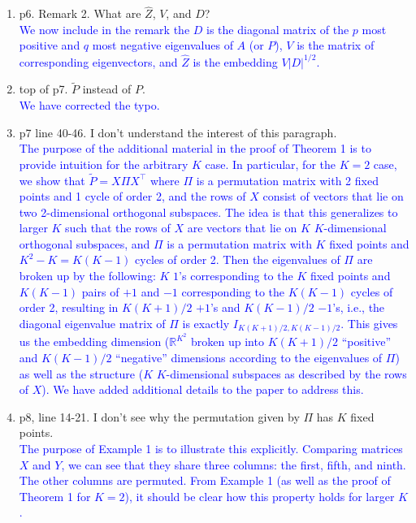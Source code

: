 \documentclass[
]{article}
\begin{document}
\begin{enumerate}
{  }
\item
  p6. Remark 2. What are \(\hat{Z}\), \(V\), and \(D\)?\\
  \textcolor{blue}{
  We now include in the remark the $D$ is the diagonal matrix of the $p$ most positive and $q$ most negative eigenvalues of $A$ (or $P$), $V$ is the matrix of corresponding eigenvectors, and $\hat{Z}$ is the embedding $V |D|^{1/2}$.
  }
\item
  top of p7. \(\tilde{P}\) instead of \({P}\).\\
  \textcolor{blue}{
  We have corrected the typo. 
  }
\item
  p7 line 40-46. I don't understand the interest of this paragraph.\\
  \textcolor{blue}{
  The purpose of the additional material in the proof of Theorem 1 is to provide intuition for the arbitrary $K$ case. 
  In particular, for the $K = 2$ case, we show that $\tilde{P} = X \Pi X^\top$ where $\Pi$ is a permutation matrix with 2 fixed points and 1 cycle of order 2, and the rows of $X$ consist of vectors that lie on two 2-dimensional orthogonal subspaces. 
  The idea is that this generalizes to larger $K$ such that the rows of $X$ are vectors that lie on $K$ $K$-dimensional orthogonal subspaces, and $\Pi$ is a permutation matrix with $K$ fixed points and $K^2 - K = K (K - 1)$ cycles of order 2. 
  Then the eigenvalues of $\Pi$ are broken up by the following: $K$ $1$'s corresponding to the $K$ fixed points and $K (K - 1)$ pairs of $+1$ and $-1$ corresponding to the $K (K - 1)$ cycles of order 2, 
  resulting in $K (K + 1) / 2$ $+1$'s and $K (K - 1) / 2$ $-1$'s, i.e., the diagonal eigenvalue matrix of $\Pi$ is exactly $I_{K (K + 1) / 2, K (K - 1) / 2}$. 
  This gives us the embedding dimension ($\mathbb{R}^{K^2}$ broken up into $K (K + 1) / 2$ ``positive'' and $K (K - 1) / 2$ ``negative'' dimensions according to the eigenvalues of $\Pi$) as well as the structure ($K$ $K$-dimensional subspaces as described by the rows of $X$). 
  We have added additional details to the paper to address this. 
  }
\item
  p8, line 14-21. I don't see why the permutation given by \(\Pi\) has
  \(K\) fixed points.\\
  \textcolor{blue}{
  The purpose of Example 1 is to illustrate this explicitly. 
  Comparing matrices $X$ and $Y$, we can see that they share three columns: the first, fifth, and ninth. 
  The other columns are permuted. 
  From Example 1 (as well as the proof of Theorem 1 for $K = 2$), it should be clear how this property holds for larger $K$. 
}
\end{enumerate}
\end{document}
